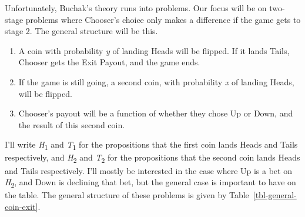 \documentclass[
  12pt,
  letterpaper,
  DIV=11,
  numbers=noendperiod]{scrreprt}
\providecommand{\tightlist}{%
  \setlength{\itemsep}{0pt}\setlength{\parskip}{0pt}}\usepackage{longtable,booktabs,array}
\begin{document}
Unfortunately, Buchak's theory runs into problems. Our focus will be on
two-stage problems where Chooser's choice only makes a difference if the
game gets to stage 2. The general structure will be this.

\begin{enumerate}
\def\labelenumi{\arabic{enumi}.}
\tightlist
\item
  A coin with probability \emph{y} of landing Heads will be flipped. If
  it lands Tails, Chooser gets the Exit Payout, and the game ends.
\item
  If the game is still going, a second coin, with probability \emph{x}
  of landing Heads, will be flipped.
\item
  Chooser's payout will be a function of whether they chose Up or Down,
  and the result of this second coin.
\end{enumerate}

I'll write \emph{H}\textsubscript{1} and \emph{T}\textsubscript{1} for
the propositions that the first coin lands Heads and Tails respectively,
and \emph{H}\textsubscript{2} and \emph{T}\textsubscript{2} for the
propositions that the second coin lands Heads and Tails respectively.
I'll mostly be interested in the case where Up is a bet on
\emph{H}\textsubscript{2}, and Down is declining that bet, but the
general case is important to have on the table. The general structure of
these problems is given by Table~\ref{tbl-general-coin-exit}.
\end{document}
